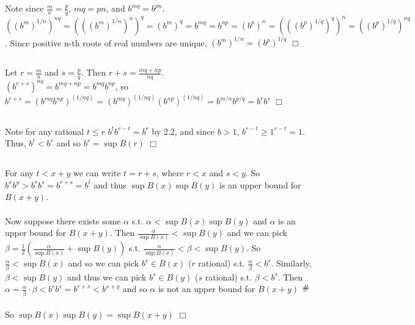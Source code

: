 \documentclass{article}
\newcommand{\contra}{\raisebox{\depth}{\#}}
\begin{document}
\section{}
\subsection{}
Note since $\frac{m}{n} = \frac{p}{q}$, $mq = pn$, and $b^{mq} = b^{pn}$.\\
$((b^m)^{1/n})^{nq} = (((b^m)^{1/n})^n)^q = (b^m)^q = b^{mq} = b^{np} = (b^p)^n = (((b^p)^{1/q})^q)^n = ((b^p)^{1/q})^{nq}$. Since positive n-th roots of real numbers are unique, $(b^m)^{1/n} = (b^p)^{1/q}$ $\Box$

\subsection{}
Let $r = \frac{m}{n}$ and $s = \frac{p}{q}$. Then $r+s = \frac{mq + np}{nq}$.\\
$(b^{r+s})^{nq} = b^{mq + np} = b^{mq}b^{np}$, so\\
$b^{r+s} = (b^{mq}b^{np})^{(1/nq)} = (b^{mq})^{(1/nq)}(b^{np})^{(1/nq)} = b^{m/n}b^{p/q} = b^{r}b^{s}$ $\Box$

\subsection{}
Note for any rational $t\leq r$ $b^{t}b^{r-t} = b^r$ by 2.2, and since $b>1$, $b^{r-t} \geq 1^{r-t} = 1$.\\
Thus, $b^t < b^r$ and so $b^r = \sup B(r)$ $\Box$

\subsection{}
For any $t < x+y$ we can write $t = r+s$, where $r<x$ and $s<y$. So $b^{x}b^{y} > b^{r}b^{s} = b^{r+s} = b^t$ and thus $\sup B(x) \sup B(y)$ is an upper bound for $B(x+y)$.\\
\\
Now suppose there exists some $\alpha$ s.t. $\alpha < \sup B(x) \sup B(y)$ and $\alpha$ is an upper bound for $B(x+y)$. Then $\frac{\alpha}{\sup B(x)} < \sup B(y) $ and we can pick $\beta = \frac{1}{2}\left( \frac{\alpha}{\sup B(x)} + \sup B(y)\right)$ s.t. $\frac{\alpha}{\sup B(x)} < \beta < \sup B(y) $. So $\frac{\alpha}{\beta} < \sup B(x)$ and so we can pick $b^r \in B(x)$ ($r$ rational) s.t. $\frac{\alpha}{\beta} < b^r$. Similarly, $\beta < \sup B(y)$ and thus we can pick $b^s \in B(y)$ ($s$ rational) s.t. $\beta < b^s$. Then $\alpha = \frac{\alpha}{\beta} \cdot \beta <b^{r}b^{s} = b^{r+s} < b^{x+y}$ and so $\alpha$ is not an upper bound for $B(x+y)$ $\contra$\\
\\
So $\sup B(x) \sup B(y) = \sup B(x+y)$ $\Box$
\end{document}
